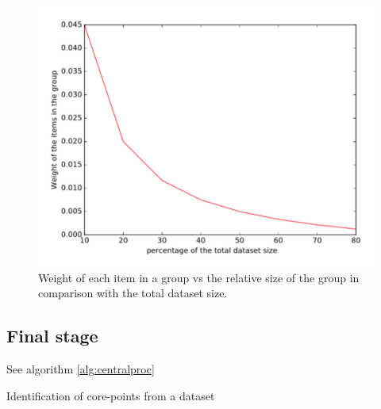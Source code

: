 \documentclass[a4paper]{article}
\begin{document}
\begin{figure}[h]
  \includegraphics[width=\linewidth]{group_weights.pdf}
  \caption{Weight of each item in a group vs the relative size of the group in comparison with the total dataset size.}
  \label{fig:group_weight}
\end{figure}



\subsection*{Final stage}
See algorithm \ref{alg:centralproc}

\begin{algorithm}[H]
   \DontPrintSemicolon
  
  \label{alg:snncorepointid}
\caption{Identification of core-points from a dataset}
\end{algorithm}
\end{document}
